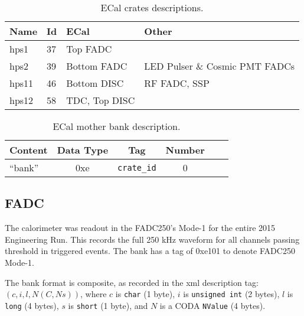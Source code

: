 \documentclass{desyproc}
\begin{document}
\begin{table}[h]
  \begin{center}
    \caption{ECal crates descriptions.}
    \label{tab:ecal-crates}
    \begin{tabular}{llll}
   	\hline
    	\bf Name & \bf Id & \bf ECal & \bf Other \\\hline
        hps1 & 37  & Top FADC & \\
        hps2 & 39  & Bottom FADC & LED Pulser \& Cosmic PMT FADCs\\
        hps11 & 46 & Bottom DISC & RF FADC, SSP \\
        hps12 & 58 & TDC, Top DISC & \\
	\hline
      \end{tabular}
  \end{center}
\end{table}

\begin{table}[h]
  \begin{center}
    \caption{ECal mother bank description.}
    \label{tab:ecal-headerBank}
    \begin{tabular}{lccccc}
   	\hline
    	\bf Content & \bf Data Type & \bf Tag & \bf Number \\\hline
        ``bank'' & 0xe & \texttt{crate\_id} & 0 \\
	\hline
      \end{tabular}
  \end{center}
\end{table}

\subsection{FADC}
The calorimeter was readout in the FADC250's Mode-1 for the entire 2015 Engineering Run.  This records the full 250 kHz waveform for all channels passing threshold in triggered events.  The bank has a tag of 0xe101 to denote FADC250 Mode-1.  

The bank format is composite, as recorded in the xml description tag:  $(c,i,l,N(C,Ns))$, where $c$ is \texttt{char} (1 byte), $i$ is \texttt{unsigned int} (2 bytes), $l$ is \texttt{long} (4 bytes), $s$ is \texttt{short} (1 byte), and $N$ is a CODA \texttt{NValue} (4 bytes). 

\end{document}
